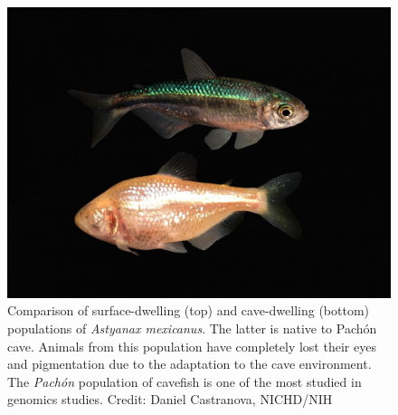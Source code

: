 \begin{figure}[ht]
\centering
\includegraphics[width=1\textwidth]{Figures/Intro/Intro_cavefish.jpg}
\caption[Comparison of populations of \textit{Astyanax mexicanus}]{Comparison of surface-dwelling (top) and cave-dwelling (bottom) populations of \textit{Astyanax mexicanus}. The latter is native to Pachón cave. Animals from this population have completely lost their eyes and pigmentation due to the adaptation to the cave environment. The \textit{Pachón} population of cavefish is one of the most studied in genomics studies. Credit: Daniel Castranova, NICHD/NIH
}
\label{fig:Intro_cavefish}
\end{figure} 

